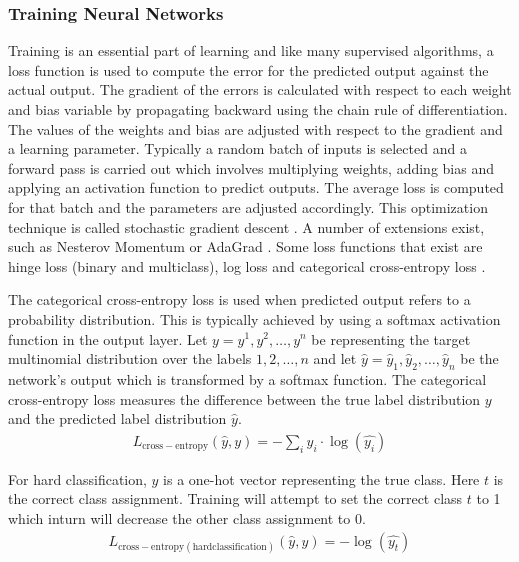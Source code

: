 \documentclass[a4paper, 11pt]{article}
\begin{document}
\subsubsection{Training Neural Networks}

Training is an essential part of learning and like many supervised algorithms, a loss function is used to compute the error for the predicted output against the actual output. The gradient of the errors is calculated with respect to each weight and bias variable by propagating backward using the chain rule of differentiation. The values of the weights and bias are adjusted with respect to the gradient and a learning parameter. Typically a random batch of inputs is selected and a forward pass is carried out which involves multiplying weights, adding bias and applying an activation function to predict outputs. The average loss is computed for that batch and the parameters are adjusted accordingly. This optimization technique is called stochastic gradient descent \parencite{Bottou2012}. A number of extensions exist, such as Nesterov Momentum \parencite{Sutskever2013} or AdaGrad \parencite{Duchi2011}. Some loss functions that exist are hinge loss (binary and multiclass), log loss and categorical cross-entropy loss \parencite{Goldberg2016}. 


The categorical cross-entropy loss is used when predicted output refers to a probability distribution. This is typically achieved by using a softmax activation function in the output layer. Let $y = y^{1}, y^{2}, \dots, y^{n}$ be representing the target multinomial distribution over the labels $1,2,\dots,n$ and let $ \hat{y} = \hat{y}_{1},\hat{y}_{2},\dots,\hat{y}_{n}$ be the network's output which is transformed by a softmax function. The categorical cross-entropy loss measures the difference between the true label distribution $y$ and the predicted label distribution $\hat{y}$. 
\begin{align*}
L_\mathrm{cross-entropy}(\hat{y},y) = -\sum_iy_i \cdot \log(\hat{y_i})
\end{align*}

For hard classification, $y$ is a one-hot vector representing the true class. Here $t$ is the correct class assignment. Training will attempt to set the correct class $t$ to 1 which inturn will decrease the other class assignment to 0.
\begin{align*}
L_{\mathrm{cross-entropy(hard classification)}}(\hat{y},y) = -\log(\hat{y_t})
\end{align*}
\end{document}
